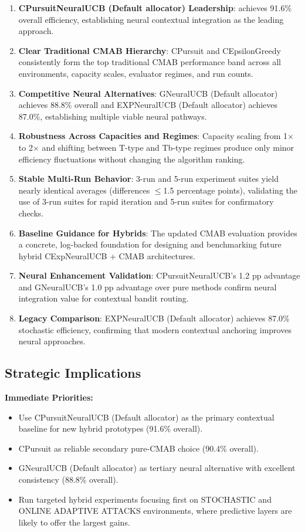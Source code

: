 \documentclass[12pt,a4paper]{article}
\newcommand{\legacy}[1]{\textcolor{legacycolor}{\textbf{#1}}}
\newcommand{\neural}[1]{\textcolor{neuralcolor}{\textbf{#1}}}
\begin{document}
\begin{enumerate}
\item \neural{CPursuitNeuralUCB (Default allocator) Leadership}: achieves 91.6\% overall efficiency, establishing neural contextual integration as the leading approach.
\item \textbf{Clear Traditional CMAB Hierarchy}: CPursuit and CEpsilonGreedy consistently form the top traditional CMAB performance band across all environments, capacity scales, evaluator regimes, and run counts.
\item \neural{Competitive Neural Alternatives}: GNeuralUCB (Default allocator) achieves 88.8\% overall and EXPNeuralUCB (Default allocator) achieves 87.0\%, establishing multiple viable neural pathways.
\item \textbf{Robustness Across Capacities and Regimes}: Capacity scaling from 1$\times$ to 2$\times$ and shifting between T-type and Tb-type regimes produce only minor efficiency fluctuations without changing the algorithm ranking.
\item \textbf{Stable Multi-Run Behavior}: 3-run and 5-run experiment suites yield nearly identical averages (differences $\leq$1.5 percentage points), validating the use of 3-run suites for rapid iteration and 5-run suites for confirmatory checks.
\item \textbf{Baseline Guidance for Hybrids}: The updated CMAB evaluation provides a concrete, log-backed foundation for designing and benchmarking future hybrid CExpNeuralUCB + CMAB architectures.
\item \neural{Neural Enhancement Validation}: CPursuitNeuralUCB's 1.2 pp advantage and GNeuralUCB's 1.0 pp advantage over pure methods confirm neural integration value for contextual bandit routing.
\item \legacy{Legacy Comparison}: EXPNeuralUCB (Default allocator) achieves 87.0\% stochastic efficiency, confirming that modern contextual anchoring improves neural approaches.
\end{enumerate}

\subsection{Strategic Implications}

\textbf{Immediate Priorities:}
\begin{itemize}
\item Use CPursuitNeuralUCB (Default allocator) as the primary contextual baseline for new hybrid prototypes (91.6\% overall).
\item CPursuit as reliable secondary pure-CMAB choice (90.4\% overall).
\item GNeuralUCB (Default allocator) as tertiary neural alternative with excellent consistency (88.8\% overall).
\item Run targeted hybrid experiments focusing first on STOCHASTIC and ONLINE ADAPTIVE ATTACKS environments, where predictive layers are likely to offer the largest gains.
\end{itemize}
\end{document}
